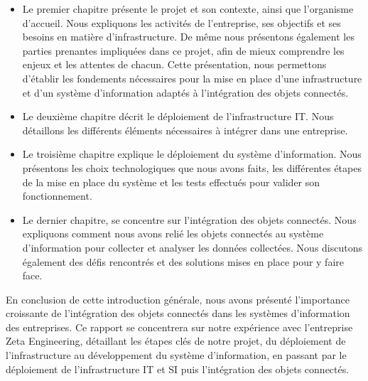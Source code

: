 {\begin{itemize}
  \item Le premier chapitre présente le projet et son contexte, ainsi que l'organisme d'accueil. Nous expliquons les activités de l'entreprise, ses objectifs et ses besoins en matière d'infrastructure. De même nous présentons également les parties prenantes impliquées dans ce projet, afin de mieux comprendre les enjeux et les attentes de chacun. Cette présentation, nous permettons d'établir les fondements nécessaires pour la mise en place d'une infrastructure et d'un système d'information adaptés à l'intégration des objets connectés. \\
  \item Le deuxième chapitre décrit le déploiement de l'infrastructure IT. Nous détaillons les différents éléments nécessaires à intégrer dans une entreprise. \\
  \item Le troisième chapitre explique le déploiement du système d'information. Nous présentons les choix technologiques que nous avons faits, les différentes étapes de la mise en place du système et les tests effectués pour valider son fonctionnement. \\
  \item Le dernier chapitre, se concentre sur l'intégration des objets connectés. Nous expliquons comment nous avons relié les objets connectés au système d'information pour collecter et analyser les données collectées. Nous discutons également des défis rencontrés et des solutions mises en place pour y faire face. \\
\end{itemize}

En conclusion de cette introduction générale, nous avons présenté l'importance croissante de l'intégration des objets connectés dans les systèmes d’information des entreprises. Ce rapport se concentrera sur notre expérience avec l'entreprise Zeta Engineering, détaillant les étapes clés de notre projet, du déploiement de l'infrastructure au développement du système d'information, en passant par le déploiement de l'infrastructure IT et SI puis l'intégration  des objets connectés.



}